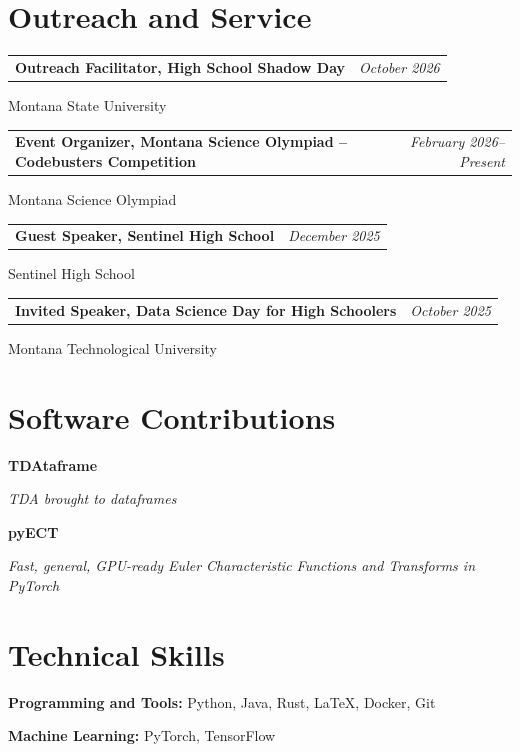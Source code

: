 \documentclass[10pt,letterpaper]{article}
\makeatletter
\newcommand{\presentation}[3]{%
  \begin{tabularx}{\textwidth}{@{}X r@{}}
    \textbf{#1} & \textit{#2}
  \end{tabularx}\par
  #3\par\vspace{7pt}%
}
\makeatother
\begin{document}
\section*{Outreach and Service}
\presentation{Outreach Facilitator, High School
Shadow Day}{October 2026}{Montana State University}
\presentation{Event Organizer, Montana Science Olympiad -- Codebusters Competition}
  {February 2026--Present}{Montana Science Olympiad}
\presentation{Guest Speaker, Sentinel High School}
  {December 2025}{Sentinel High School}
\presentation{Invited Speaker, Data Science Day for High Schoolers}
  {October 2025}{Montana Technological University}

\section*{Software Contributions}
\textbf{TDAtaframe}\par
\emph{TDA brought to dataframes}\par\vspace{6pt}
\textbf{pyECT}\par
\emph{Fast, general, GPU-ready Euler Characteristic Functions and Transforms in PyTorch}

\section*{Technical Skills}
\textbf{Programming and Tools:} Python, Java, Rust,
\LaTeX, Docker, Git\par\vspace{2pt}
\textbf{Machine Learning:} PyTorch, TensorFlow
\end{document}
